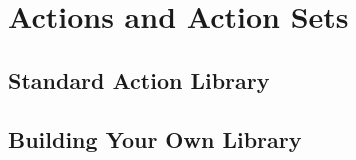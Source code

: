 \chapter{Actions and Action Sets}



\section{Standard Action Library}




\section{Building Your Own Library}

